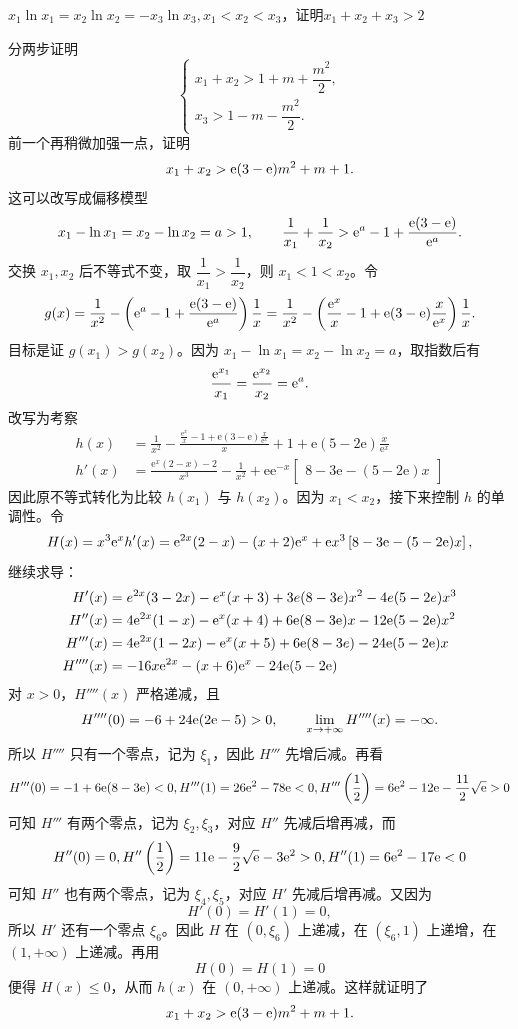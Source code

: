 \newpage
\begin{example}[零点比较]
    $x_1\ln x_1=x_2\ln x_2=-x_3\ln x_3,x_1<x_2<x_3$，证明$x_1+x_2+x_3>2$
\end{example}
\begin{solution}
分两步证明
\[
\begin{cases}
x_1+x_2>1+m+\dfrac{m^2}{2},\\
x_3>1-m-\dfrac{m^2}{2}.
\end{cases}
\]
前一个再稍微加强一点，证明
\[
x_1+x_2>\mathrm{e}(3-\mathrm{e})m^2+m+1.
\]
这可以改写成偏移模型
\[
x_1-\ln x_1=x_2-\ln x_2=a>1,\qquad \frac1{x_1}+\frac1{x_2}>\mathrm{e}^a-1+\dfrac{\mathrm{e}(3-\mathrm{e})}{\mathrm{e}^a}.
\]
交换 $x_1,x_2$ 后不等式不变，取 $\dfrac1{x_1}>\dfrac1{x_2}$，则 $x_1<1<x_2$。令
\[
g(x)=\frac{1}{x^2}-\left(\mathrm{e}^a-1+\dfrac{\mathrm{e}(3-\mathrm{e})}{\mathrm{e}^a}\right)\frac{1}{x}
=\frac{1}{x^2}-\left(\frac{\mathrm{e}^x}{x}-1+\mathrm{e}(3-\mathrm{e})\dfrac{x}{\mathrm{e}^x}\right)\frac{1}{x}.
\]
目标是证 $g(x_1)>g(x_2)$。因为 $x_1-\ln x_1=x_2-\ln x_2=a$，取指数后有
\[
\frac{\mathrm{e}^{x_1}}{x_1}=\frac{\mathrm{e}^{x_2}}{x_2}=\mathrm{e}^a.
\]
改写为考察
\begin{align*}
h(x)&=\frac{1}{x^2}-\frac{\frac{\mathrm{e}^x}{x}-1+\mathrm{e}(3-\mathrm{e})\frac{x}{\mathrm{e}^x}}{x}+1+\mathrm{e}(5-2\mathrm{e})\frac{x}{\mathrm{e}^x}\\
h'(x)&=\frac{\mathrm{e}^x(2-x)-2}{x^3}-\frac{1}{x^2}+\mathrm{e}\mathrm{e}^{-x}\begin{bmatrix}8-3\mathrm{e}-(5-2\mathrm{e})x\end{bmatrix}
\end{align*}
因此原不等式转化为比较 $h(x_1)$ 与 $h(x_2)$。因为 $x_1<x_2$，接下来控制 $h$ 的单调性。令
\[
H(x)=x^3\mathrm{e}^xh'(x)=\mathrm{e}^{2x}(2-x)-(x+2)\mathrm{e}^x+\mathrm{e}x^3\left[8-3\mathrm{e}-(5-2\mathrm{e})x\right],
\]
继续求导：
\begin{align*}
    H'(x)&=e^{2x}(3-2x)-e^x(x+3)+3e(8-3e)x^2-4e(5-2e)x^3\\
H''(x)&=4\mathrm{e}^{2x}(1-x)-\mathrm{e}^x(x+4)+6\mathrm{e}(8-3\mathrm{e})x-12\mathrm{e}(5-2\mathrm{e})x^2\\
H'''(x)&=4\mathrm{e}^{2x}(1-2x)-\mathrm{e}^x(x+5)+6\mathrm{e}(8-3e)-24\mathrm{e}(5-2\mathrm{e})x\\
H''''(x)&=-16x\mathrm{e}^{2x}-(x+6)\mathrm{e}^x-24\mathrm{e}(5-2\mathrm{e})
\end{align*}
对 $x>0$，$H''''(x)$ 严格递减，且
\[
H''''(0)=-6+24\mathrm{e}(2\mathrm{e}-5)>0,\qquad \lim_{x\to+\infty}H''''(x)=-\infty.
\]
所以 $H''''$ 只有一个零点，记为 $\xi_1$，因此 $H'''$ 先增后减。再看
\[H'''(0)=-1+6\mathrm{e}(8-3\mathrm{e})<0,H'''(1)=26\mathrm{e}^2-78\mathrm{e}<0,H'''\left(\frac12\right)=6\mathrm{e}^2-12\mathrm{e}-\frac{11}{2}\sqrt{\mathrm{e}}>0\]
可知 $H'''$ 有两个零点，记为 $\xi_2,\xi_3$，对应 $H''$ 先减后增再减，而
\[H''(0)=0,H''\left(\frac12\right)=11\mathrm{e}-\frac{9}{2}\sqrt{\mathrm{e}}-3\mathrm{e}^2>0,H''(1)=6\mathrm{e}^2-17\mathrm{e}<0\]
可知 $H''$ 也有两个零点，记为 $\xi_4,\xi_5$，对应 $H'$ 先减后增再减。又因为
\[
H'(0)=H'(1)=0,
\]
所以 $H'$ 还有一个零点 $\xi_6$。因此 $H$ 在 $(0,\xi_6)$ 上递减，在 $(\xi_6,1)$ 上递增，在 $(1,+\infty)$ 上递减。再用
\[
H(0)=H(1)=0
\]
便得 $H(x)\le0$，从而 $h(x)$ 在 $(0,+\infty)$ 上递减。这样就证明了
\[
x_1+x_2>\mathrm{e}(3-\mathrm{e})m^2+m+1.
\]


\end{solution}
